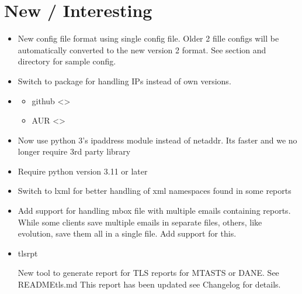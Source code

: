 \documentclass[letterpaper,10pt,english]{sphinxmanual}
\begin{document}
\section{New / Interesting}
\label{\detokenize{README:new-interesting}}
\sphinxAtStartPar
{}
\begin{itemize}
\item {} 
\sphinxAtStartPar
New config file format using single config file. Older 2 fille configs will be automatically
converted to the new version 2 format. See {\hyperref[\detokenize{README:config-files-section}]{}} section and
 directory for sample config.

\item {} 
\sphinxAtStartPar
Switch to  package for handling IPs instead of own versions.

\item {} \begin{description}
\begin{itemize}
\item {} 
\sphinxAtStartPar
github \textless{}\textgreater{}

\item {} 
\sphinxAtStartPar
AUR \textless{}\textgreater{}

\end{itemize}

\end{description}

\item {} 
\sphinxAtStartPar
Now use python 3’s ipaddress module instead of netaddr.
Its faster and we no longer require 3rd party library

\item {} 
\sphinxAtStartPar
Require python version 3.11 or later

\item {} 
\sphinxAtStartPar
Switch to lxml for better handling of xml namespaces found in some reports

\item {} 
\sphinxAtStartPar
Add support for handling mbox file with multiple emails containing reports.
While some clients save multiple emails in separate  files, others, like
evolution, save them all in a single  file. Add support for this.

\item {} 
\sphinxAtStartPar
tls\sphinxhyphen{}rpt

\sphinxAtStartPar
New tool to generate report for TLS reports for MTA\sphinxhyphen{}STS or DANE. See README\sphinxhyphen{}tls.md
This report has been updated \sphinxhyphen{} see Changelog for details.

\end{itemize}
\end{document}
